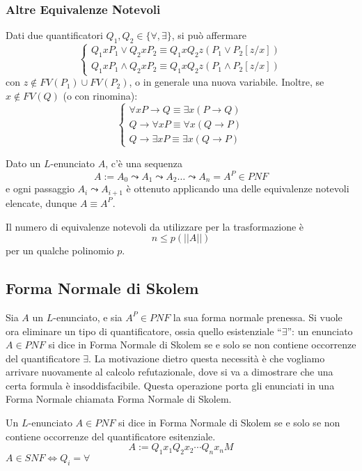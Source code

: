 \subsubsection{Altre Equivalenze Notevoli}
Dati due quantificatori $Q_1, Q_2 \in \{\forall, \exists\}$, si può affermare
\[
        \begin{cases}
                Q_1 x P_1 \lor Q_2 x P_2 \equiv Q_1 x Q_2 z (P_1 \lor P_2[z/x]) \\
                Q_1 x P_1 \land Q_2 x P_2 \equiv Q_1 x Q_2 z (P_1 \land P_2[z/x])
        \end{cases}
\]
con $z \notin FV(P_1) \cup FV(P_2)$, o in generale una nuova variabile.
Inoltre, se $x \notin FV(Q)$ (o con rinomina): 
$$
        \begin{cases}
                \forall x P \rightarrow Q \equiv \exists x (P \rightarrow Q) \\
                Q \rightarrow \forall x P \equiv \forall x (Q \rightarrow P) \\
                Q \rightarrow \exists x P  \equiv \exists x (Q \rightarrow P)
        \end{cases}
$$

\noindent
Dato un $L$-enunciato $A$, c'è una sequenza
$$
A := A_0 \leadsto A_1 \leadsto A_2 \ldots \leadsto A_n = A^P \in PNF
$$
e ogni passaggio  $A_i \leadsto A_{i+1}$ è ottenuto applicando una delle equivalenze 
notevoli elencate, dunque $A \equiv A^P$. 
\begin{oss}
        Il numero di equivalenze notevoli da utilizzare per la trasformazione è 
        $$
        n \leq p(||A||)
        $$
        per un qualche polinomio $p$. 
\end{oss}

\subsection{Forma Normale di Skolem}
Sia $A$ un $L$-enunciato, e sia $A^P \in PNF$ la sua forma normale prenessa. Si 
vuole ora eliminare un tipo di quantificatore, ossia quello esistenziale ``$\exists$'': 
un enunciato $A \in PNF$ si dice in Forma Normale di Skolem se e solo se non 
contiene occorrenze del quantificatore $\exists$. 
La motivazione dietro questa necessità è che vogliamo arrivare nuovamente 
al calcolo refutazionale, dove si va a dimostrare che una certa formula è 
insoddisfacibile. Questa operazione porta gli enunciati in una Forma Normale 
chiamata Forma Normale di Skolem. 

\begin{defi}
        Un $L$-enunciato $A \in PNF$ si dice in Forma Normale di Skolem 
        se e solo se non contiene occorrenze del quantificatore esitenziale. 
        $$
        A := Q_1 x_1 Q_2 x_2 \cdots Q_n x_n M 
        $$
        $A \in SNF \iff Q_i = \forall$
\end{defi}

